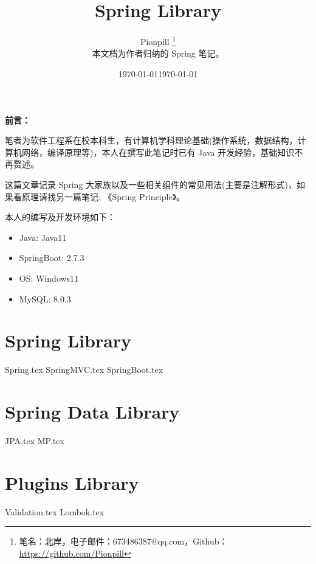 \documentclass{PionpillNote-book}
\title{Spring Library}
\author{
    Pionpill \footnote{笔名：北岸，电子邮件：673486387@qq.com，Github：\url{https://github.com/Pionpill}} \\
    本文档为作者归纳的 Spring 笔记。\\
}
\date{\today}
\begin{document}
\pagestyle{plain}
\maketitle

\noindent\textbf{前言：}

笔者为软件工程系在校本科生，有计算机学科理论基础(操作系统，数据结构，计算机网络，编译原理等)，本人在撰写此笔记时已有 Java 开发经验，基础知识不再赘述。

这篇文章记录 Spring 大家族以及一些相关组件的常见用法(主要是注解形式)，如果看原理请找另一篇笔记: 《Spring Principle》。

本人的编写及开发环境如下：
\begin{itemize}
    \item Java: Java11
    \item SpringBoot: 2.7.3
    \item OS: Windows11
    \item MySQL: 8.0.3
\end{itemize}

\date{\today}
\newpage

\tableofcontents

\newpage

\setcounter{page}{1}
\pagestyle{fancy}

\part{Spring Library}
{Spring.tex}
{SpringMVC.tex}
{SpringBoot.tex}
\part{Spring Data Library}
{JPA.tex}
{MP.tex}

\part{Plugins Library}
{Validation.tex}
{Lombok.tex}
\end{document}
